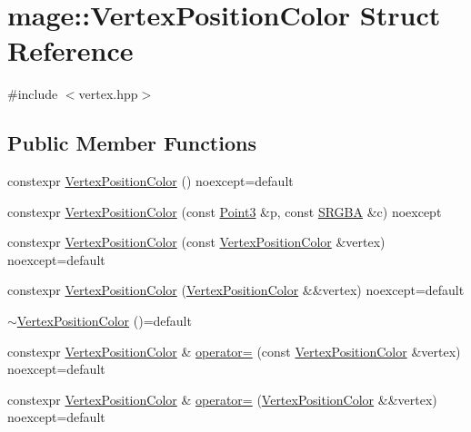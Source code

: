 \hypertarget{structmage_1_1_vertex_position_color}{}\section{mage\+:\+:Vertex\+Position\+Color Struct Reference}
\label{structmage_1_1_vertex_position_color}


{\ttfamily \#include $<$vertex.\+hpp$>$}

\subsection*{Public Member Functions}
\begin{DoxyCompactItemize}
\item 
constexpr \hyperlink{structmage_1_1_vertex_position_color_a1d9bbf97086b3006e9fdf5e70f75d4c7}{Vertex\+Position\+Color} () noexcept=default
\item 
constexpr \hyperlink{structmage_1_1_vertex_position_color_a6ef8663606fb054b70c46557a7fe281b}{Vertex\+Position\+Color} (const \hyperlink{structmage_1_1_point3}{Point3} \&p, const \hyperlink{structmage_1_1_s_r_g_b_a}{S\+R\+G\+BA} \&c) noexcept
\item 
constexpr \hyperlink{structmage_1_1_vertex_position_color_a6eb765ab99973819d86359dcbba9e856}{Vertex\+Position\+Color} (const \hyperlink{structmage_1_1_vertex_position_color}{Vertex\+Position\+Color} \&vertex) noexcept=default
\item 
constexpr \hyperlink{structmage_1_1_vertex_position_color_ac2ab05829423e41f638f5a93cc236fed}{Vertex\+Position\+Color} (\hyperlink{structmage_1_1_vertex_position_color}{Vertex\+Position\+Color} \&\&vertex) noexcept=default
\item 
\hyperlink{structmage_1_1_vertex_position_color_a18c4400389dfd47482a7d0901d904aec}{$\sim$\+Vertex\+Position\+Color} ()=default
\item 
constexpr \hyperlink{structmage_1_1_vertex_position_color}{Vertex\+Position\+Color} \& \hyperlink{structmage_1_1_vertex_position_color_a76e9a602b85191a4651610fb8f99a541}{operator=} (const \hyperlink{structmage_1_1_vertex_position_color}{Vertex\+Position\+Color} \&vertex) noexcept=default
\item 
constexpr \hyperlink{structmage_1_1_vertex_position_color}{Vertex\+Position\+Color} \& \hyperlink{structmage_1_1_vertex_position_color_a02ad0c89f38799200a0b475a45fbbcd6}{operator=} (\hyperlink{structmage_1_1_vertex_position_color}{Vertex\+Position\+Color} \&\&vertex) noexcept=default
\end{DoxyCompactItemize}
